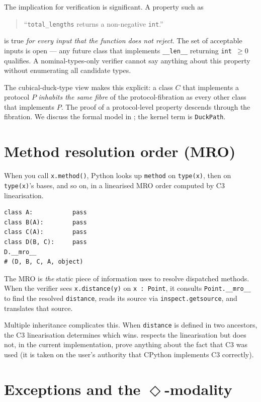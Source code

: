 The implication for verification is significant.  A property such as
\begin{quote}
``\texttt{total\_lengths} returns a non-negative \texttt{int}.''
\end{quote}
is true \emph{for every input that the function does not reject}.
The set of acceptable inputs is open --- any future class that
implements \texttt{\_\_len\_\_} returning \texttt{int $\ge 0$}
qualifies.  A nominal-types-only verifier cannot say anything about
this property without enumerating all candidate types.

The cubical-duck-type view makes this explicit: a class $C$ that
implements a protocol $P$ \emph{inhabits the same fibre} of the
protocol-fibration as every other class that implements $P$.  The
proof of a protocol-level property descends through the fibration.
We discuss the formal model in ; the kernel term is
\verb|DuckPath|.

\section{Method resolution order (MRO)}
\label{sec:mro}

When you call \verb|x.method()|, Python looks up \verb|method| on
\verb|type(x)|, then on \verb|type(x)|'s bases, and so on, in a
linearised MRO order computed by C3 linearisation.

\begin{lstlisting}[language=psdl]
class A:           pass
class B(A):        pass
class C(A):        pass
class D(B, C):     pass
D.__mro__
# (D, B, C, A, object)
\end{lstlisting}

The MRO is \emph{the} static piece of information \Deppy{} uses to
resolve dispatched methods.  When the verifier sees
\texttt{x.distance(y)} on \texttt{x : Point}, it consults
\verb|Point.__mro__| to find the resolved \verb|distance|, reads its
source via \verb|inspect.getsource|, and translates that source.

Multiple inheritance complicates this.  When \verb|distance| is
defined in two ancestors, the C3 linearisation determines which
wins.  \Deppy{} respects the linearisation but does not, in the
current implementation, prove anything about the fact that C3 was
used (it is taken on the user's authority that CPython implements
C3 correctly).

\section{Exceptions and the $\Diamond$-modality}
\label{sec:exceptions}

